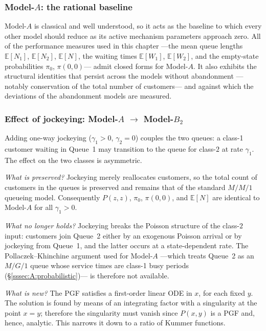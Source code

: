 \subsubsection*{Model-\texorpdfstring{$A$}{A}: the rational baseline}

Model-$A$ is classical and well understood, so it acts as the baseline to which every other model should reduce as its active mechanism parameters approach zero. All of the performance measures used in this chapter ---the mean queue lengths $\mathbb{E}[N_1]$, $\mathbb{E}[N_2]$, $\mathbb{E}[N]$, the waiting times $\mathbb{E}[W_1]$, $\mathbb{E}[W_2]$, and the empty-state probabilities $\pi_0$, $\pi(0,0)$--- admit closed forms for Model-$A$. It also exhibits the structural identities that persist across the models without abandonment ---notably conservation of the total number of customers--- and against which the deviations of the abandonment models are measured.


\subsubsection*{Effect of jockeying: Model-\texorpdfstring{$A$}{A} \texorpdfstring{$\to$}{->} Model-\texorpdfstring{$B_2$}{B2}}

Adding one-way jockeying ($\gamma_1>0$, $\gamma_2=0$) couples the two queues: a class-1 customer waiting in Queue~1 may transition to the queue for class-$2$ at rate $\gamma_1$. The effect on the two classes is asymmetric.

\emph{What is preserved?} Jockeying merely reallocates customers, so the total count of customers in the queues is preserved and remains that of the standard $M/M/1$ queueing model. Consequently $P(z,z)$, $\pi_0$, $\pi(0,0)$, and $\mathbb{E}[N]$ are identical
to Model-$A$ for all $\gamma_1>0$.

\emph{What no longer holds?} Jockeying breaks the Poisson structure of the class-$2$ input: customers join Queue~2 either by an exogenous Poisson arrival or by jockeying from Queue~1, and the latter occurs at a state-dependent rate. The Pollaczek--Khinchine argument used for Model-$A$ ---which treats Queue~2 as an $M/G/1$ queue whose service times are class-1 busy periods (\S\ref{sssec:A:probabilistic})--- is therefore not available.

\emph{What is new?}
The PGF satisfies a first-order linear ODE in $x$, for each fixed $y$. The solution is found by means of an integrating factor with a singularity at the point $x=y$; therefore the singularity must vanish since $P(x,y)$ is a PGF and, hence, analytic. This narrows it down to a ratio of Kummer functions.


